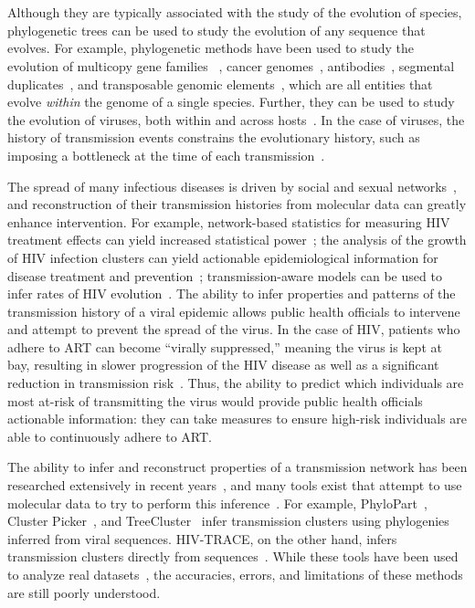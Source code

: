 \chapter*{\introtitle}
\clearpage

Although they are typically associated with the study of the evolution of species, phylogenetic trees can be used to study the evolution of any sequence that evolves. For example, phylogenetic methods have been used to study the evolution of multicopy gene families~ \cite{Page1997}, cancer genomes~\cite{El-Kebir2016,Nowell1976}, antibodies~\cite{Litman1993,Robinson2015,Safonova2015}, segmental duplicates~\cite{Bailey2006,Jiang2007}, and transposable genomic elements~\cite{Dewannieux2003,Moshiri2017}, which are all entities that evolve \textit{within} the genome of a single species. Further, they can be used to study the evolution of viruses, both within and across hosts~\cite{Frost2001,Lemey2006,Vrancken2014}. In the case of viruses, the history of transmission events constrains the evolutionary history, such as imposing a bottleneck at the time of each transmission~\cite{Carlson2014}.

The spread of many infectious diseases is driven by social and sexual networks~\cite{Rivas2012}, and reconstruction of their transmission histories from molecular data can greatly enhance intervention. For example, network-based statistics for measuring \gls{HIV} treatment effects can yield increased statistical power~\cite{Wertheim2011}; the analysis of the growth of \gls{HIV} infection clusters can yield actionable epidemiological information for disease treatment and prevention~\cite{Aldous2012,Brenner2013}; transmission-aware models can be used to infer rates of \gls{HIV} evolution~\cite{Vrancken2014}. The ability to infer properties and patterns of the transmission history of a viral epidemic allows public health officials to intervene and attempt to prevent the spread of the virus. In the case of \gls{HIV}, patients who adhere to \gls{ART} can become ``virally suppressed,'' meaning the virus is kept at bay, resulting in slower progression of the \gls{HIV} disease as well as a significant reduction in transmission risk~\cite{AIDSinfo2019}. Thus, the ability to predict which individuals are most at-risk of transmitting the virus would provide public health officials actionable information: they can take measures to ensure high-risk individuals are able to continuously adhere to \gls{ART}.

The ability to infer and reconstruct properties of a transmission network has been researched extensively in recent years~\cite{Wertheim2017,Ragonnet-Cronin2019}, and many tools exist that attempt to use molecular data to try to perform this inference~\cite{Rose2017}. For example, PhyloPart~\cite{Prosperi2011}, Cluster Picker~\cite{Ragonnet-Cronin2013}, and TreeCluster~\cite{Balaban2019} infer transmission clusters using phylogenies inferred from viral sequences. HIV-TRACE, on the other hand, infers transmission clusters directly from sequences~\cite{Pond2018}. While these tools have been used to analyze real datasets~\cite{Campbell2017}, the accuracies, errors, and limitations of these methods are still poorly understood.

